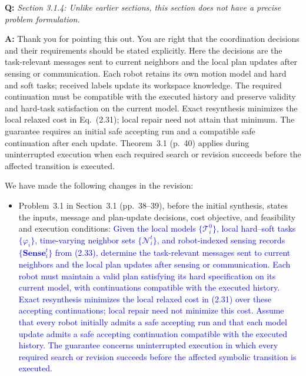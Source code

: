 \documentclass[11pt]{article}
\newcommand{\change}[1]{\textcolor{blue}{#1}}
\begin{document}
\begin{shaded*}
\noindent\textbf{Q:} \emph{Section 3.1.4: Unlike earlier sections, this
section does not have a precise problem formulation.}
\end{shaded*}
\noindent\textbf{A:} Thank you for pointing this out. You are right that
the coordination decisions and their requirements should be stated explicitly.
Here the decisions are the task-relevant messages sent to current neighbors
and the local plan updates after sensing or communication. Each robot retains
its own motion model and hard and soft tasks; received labels update its
workspace knowledge. The required continuation must be compatible with the
executed history and preserve validity and hard-task satisfaction on the
current model. Exact resynthesis minimizes the local relaxed cost in
Eq.~(2.31); local repair need not attain that minimum. The guarantee requires
an initial safe accepting run and a compatible safe continuation after each
update. Theorem~3.1 (p.~40) applies during uninterrupted execution when each
required search or revision succeeds before the affected transition is executed.

We have made the following changes in the revision:
\begin{itemize}
\item Problem~3.1 in Section~3.1 (pp.~38--39), before the initial synthesis,
states the inputs, message and plan-update decisions, cost objective, and
feasibility and execution conditions:
\change{Given the local models $\{\mathcal{T}_i^0\}$, local hard--soft tasks
$\{\varphi_i\}$, time-varying neighbor sets $\{\mathcal{N}_i^t\}$,
and robot-indexed sensing records $\{\textbf{Sense}_i^t\}$ from
(2.33), determine the task-relevant messages sent to
current neighbors and the local plan updates after sensing or communication.
Each robot must maintain a valid plan satisfying its hard specification on
its current model, with continuations compatible with the executed history.
Exact resynthesis minimizes the local relaxed cost in
(2.31) over these accepting continuations; local repair
need not minimize this cost. Assume that every robot initially admits a
safe accepting run and that each model update admits a safe accepting
continuation compatible with the executed history. The guarantee concerns
uninterrupted execution in which every required search or revision succeeds
before the affected symbolic transition is executed.}
\end{itemize}
\end{document}
